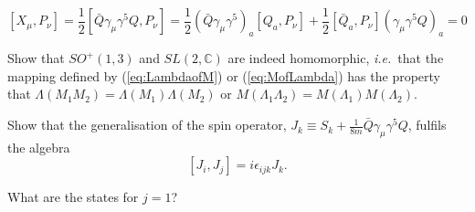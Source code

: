 \documentclass[notes.tex]{subfiles}
\begin{document}
\begin{Answer} 
\[
[X_\mu,P_\nu]=\frac{1}{2}[\bar Q\gamma_\mu\gamma^5Q,P_\nu]=\frac{1}{2}(\bar Q\gamma_\mu\gamma^5)_a[Q_a,P_\nu]+\frac{1}{2}[\bar Q_a,P_\nu](\gamma_\mu\gamma^5Q)_a=0
\]
\end{Answer}

\begin{Exercise}[]
Show that $SO^+(1,3)$ and $SL(2, \mathbb{C})$ are indeed homomorphic, {\it i.e.}\ that the mapping defined by (\ref{eq:LambdaofM}) or (\ref{eq:MofLambda}) has the property that $\Lambda(M_1M_2)=\Lambda(M_1)\Lambda(M_2)$ or $M(\Lambda_1\Lambda_2)=M(\Lambda_1)M(\Lambda_2)$.
\end{Exercise}

\begin{Exercise}[]
Show that the generalisation of the spin operator, $J_k\equiv S_k + \frac{1}{8m}\bar{Q}\gamma_\mu \gamma^5 Q$, fulfils the algebra
\[[J_i, J_j] = i\epsilon_{ijk}J_k.\]
\end{Exercise}

\begin{Exercise}[]
What are the states for $j=1$?
\end{Exercise}
\end{document}
